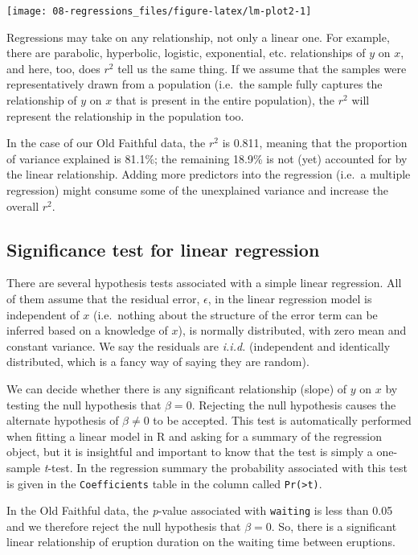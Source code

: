 \documentclass[english,10pt,a4paper,oneside]{book}
\theoremstyle{definition}
\theoremstyle{definition}
\theoremstyle{definition}
\theoremstyle{remark}
\begin{document}
\texttt{[image: 08-regressions\_files/figure-latex/lm-plot2-1]}

Regressions may take on any relationship, not only a linear one. For
example, there are parabolic, hyperbolic, logistic, exponential, etc.
relationships of \(y\) on \(x\), and here, too, does \(r^{2}\) tell us
the same thing. If we assume that the samples were representatively
drawn from a population (i.e.~the sample fully captures the relationship
of \(y\) on \(x\) that is present in the entire population), the
\(r^{2}\) will represent the relationship in the population too.

In the case of our Old Faithful data, the \(r^{2}\) is 0.811, meaning
that the proportion of variance explained is 81.1\%; the remaining
18.9\% is not (yet) accounted for by the linear relationship. Adding
more predictors into the regression (i.e.~a multiple regression) might
consume some of the unexplained variance and increase the overall
\(r^{2}\).

\hypertarget{significance-test-for-linear-regression}{%
\subsection{Significance test for linear
regression}\label{significance-test-for-linear-regression}}

There are several hypothesis tests associated with a simple linear
regression. All of them assume that the residual error, \(\epsilon\), in
the linear regression model is independent of \(x\) (i.e.~nothing about
the structure of the error term can be inferred based on a knowledge of
\(x\)), is normally distributed, with zero mean and constant variance.
We say the residuals are \emph{i.i.d.} (independent and identically
distributed, which is a fancy way of saying they are random).

We can decide whether there is any significant relationship (slope) of
\(y\) on \(x\) by testing the null hypothesis that \(\beta=0\).
Rejecting the null hypothesis causes the alternate hypothesis of
\(\beta \neq 0\) to be accepted. This test is automatically performed
when fitting a linear model in R and asking for a summary of the
regression object, but it is insightful and important to know that the
test is simply a one-sample \emph{t}-test. In the regression summary the
probability associated with this test is given in the
\texttt{Coefficients} table in the column called
\texttt{Pr(\textgreater{}\textbar{}t\textbar{})}.

In the Old Faithful data, the \emph{p}-value associated with
\texttt{waiting} is less than 0.05 and we therefore reject the null
hypothesis that \(\beta=0\). So, there is a significant linear
relationship of eruption duration on the waiting time between eruptions.
\end{document}

